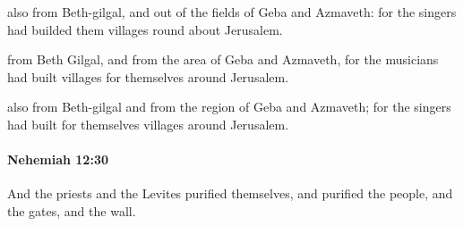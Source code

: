 			\begin{versebox}
					\item[BHS] 
					\item[LXX] 
					\item[ASV] also from Beth-gilgal, and out of the fields of Geba and Azmaveth: for the singers had builded them villages round about Jerusalem.
					\item[NIV] from Beth Gilgal, and from the area of Geba and Azmaveth, for the musicians had built villages for themselves around Jerusalem.
					\item[NRSV] also from Beth-gilgal and from the region of Geba and Azmaveth; for the singers had built for themselves villages around Jerusalem.
			\end{versebox}

		\paragraph{Nehemiah 12:30} %
			\label{NEHEMIAH-12-30}

			And the priests and the Levites purified themselves, and purified the people, and the gates, and the wall.

